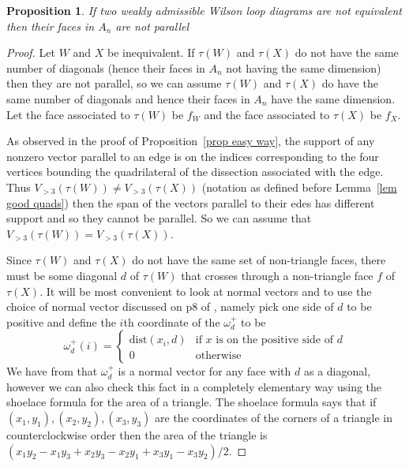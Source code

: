 \documentclass[11pt]{article}
\newtheorem{prop}[thm]{Proposition}
\theoremstyle{remark}
\theoremstyle{definition}
\begin{document}
\begin{prop}\label{prop hard way}
  If two weakly admissible Wilson loop diagrams are not equivalent then their faces in $A_n$ are not parallel
\end{prop}

\begin{proof}
  Let $W$ and $X$ be inequivalent.  If $\tau(W)$ and $\tau(X)$ do not have the same number of diagonals (hence their faces in $A_n$ not having the same dimension) then they are not parallel, so we can assume $\tau(W)$ and $\tau(X)$ do have the same number of diagonals and hence their faces in $A_n$ have the same dimension.  Let the face associated to $\tau(W)$ be $f_W$ and the face associated to $\tau(X)$ be $f_X$.

  As observed in the proof of Proposition~\ref{prop easy way}, the support of any nonzero vector parallel to an edge is on the indices corresponding to the four vertices bounding the quadrilateral of the dissection associated with the edge.  Thus $V_{>3}(\tau(W)) \neq V_{>3}(\tau(X))$ (notation as defined before Lemma~\ref{lem good quads}) then the span of the vectors parallel to their edes has different support and so they cannot be parallel.  So we can assume that $V_{>3}(\tau(W)) = V_{>3}(\tau(X))$.

    Since $\tau(W)$ and $\tau(X)$ do not have the same set of non-triangle faces, there must be some diagonal $d$ of $\tau(W)$ that crosses through a non-triangle face $f$ of $\tau(X)$. 
    It will be most convenient to look at normal vectors and to use the choice of normal vector discussed on p8 of \cite{CSZinequivalent}, namely pick one side of $d$ to be positive and define the $i$th coordinate of the $\omega^+_d$ to be
    \[
    \omega^+_d(i) = \begin{cases} \text{dist}(x_i, d) & \text{if $x$ is on the positive side of $d$}\\ 0 & \text{otherwise} \end{cases}
    \]
    We have from \cite{CSZinequivalent} that $\omega^+_d$ is a normal vector for any face with $d$ as a diagonal, however we can also check this fact in a completely elementary way using the shoelace formula for the area of a triangle.  The shoelace formula says that if $(x_1, y_1), (x_2, y_2), (x_3, y_3)$ are the coordinates of the corners of a triangle in counterclockwise order then the area of the triangle is $(x_1y_2 - x_1y_3 + x_2y_3 - x_2y_1 + x_3y_1 - x_3y_2)/2$.


\end{proof}
\end{document}
